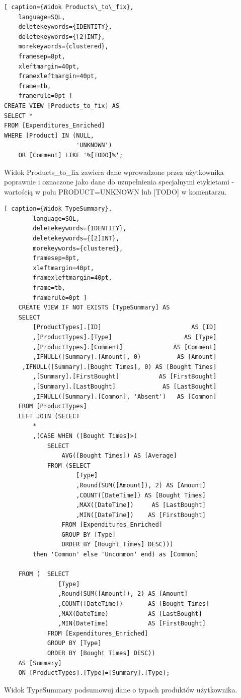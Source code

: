 \documentclass[a4paper,10pt, twoside]{report}
\begin{document}
\begin{minipage}{\textwidth}
\begin{lstlisting}[ caption={Widok Products\_to\_fix},
    language=SQL,
    deletekeywords={IDENTITY},
    deletekeywords={[2]INT},
    morekeywords={clustered},
    framesep=8pt,
    xleftmargin=40pt,
    framexleftmargin=40pt,
    frame=tb,
    framerule=0pt ]
CREATE VIEW [Products_to_fix] AS
SELECT *
FROM [Expenditures_Enriched]
WHERE [Product] IN (NULL,
                    'UNKNOWN')
    OR [Comment] LIKE '%[TODO]%';
\end{lstlisting}
{Widok Products\_to\_fix zawiera dane wprowadzone przez użytkownika poprawnie i 
oznaczone jako dane do uzupełnienia specjalnymi etykietami - wartością w polu 
PRODUCT=UNKNOWN lub [TODO] w komentarzu.}
\end{minipage}

\begin{minipage}{\textwidth}
    \begin{lstlisting}[ caption={Widok TypeSummary},
        language=SQL,
        deletekeywords={IDENTITY},
        deletekeywords={[2]INT},
        morekeywords={clustered},
        framesep=8pt,
        xleftmargin=40pt,
        framexleftmargin=40pt,
        frame=tb,
        framerule=0pt ]
    CREATE VIEW IF NOT EXISTS [TypeSummary] AS
    SELECT
        [ProductTypes].[ID]                         AS [ID]
        ,[ProductTypes].[Type]                    AS [Type]
        ,[ProductTypes].[Comment]              AS [Comment]
        ,IFNULL([Summary].[Amount], 0)          AS [Amount]
     ,IFNULL([Summary].[Bought Times], 0) AS [Bought Times]
        ,[Summary].[FirstBought]           AS [FirstBought]
        ,[Summary].[LastBought]             AS [LastBought]
        ,IFNULL([Summary].[Common], 'Absent')   AS [Common]
    FROM [ProductTypes]
    LEFT JOIN (SELECT 
        *
        ,(CASE WHEN ([Bought Times]>(
            SELECT 
                AVG([Bought Times]) AS [Average] 
            FROM (SELECT
                    [Type]
                    ,Round(SUM([Amount]), 2) AS [Amount]
                    ,COUNT([DateTime]) AS [Bought Times]
                    ,MAX([DateTime])     AS [LastBought]
                    ,MIN([DateTime])    AS [FirstBought]
                FROM [Expenditures_Enriched]
                GROUP BY [Type]
                ORDER BY [Bought Times] DESC))) 
        then 'Common' else 'Uncommon' end) as [Common]
        
    FROM (	SELECT
               [Type]
               ,Round(SUM([Amount]), 2) AS [Amount]
               ,COUNT([DateTime])       AS [Bought Times]
               ,MAX(DateTime)           AS [LastBought]
               ,MIN(DateTime)           AS [FirstBought]
            FROM [Expenditures_Enriched]
            GROUP BY [Type]
            ORDER BY [Bought Times] DESC))
    AS [Summary]
    ON [ProductTypes].[Type]=[Summary].[Type];
    \end{lstlisting}
    {Widok TypeSummary podsumowuj dane o typach produktów użytkownika.}
    \end{minipage}
    
\end{document}
